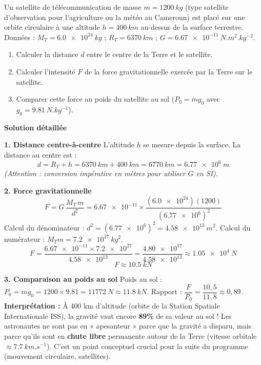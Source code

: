 \documentclass[11pt]{article}
\begin{document}
\begin{exoresolu}
Un satellite de télécommunication de masse $m = \SI{1200}{kg}$ (type satellite d'observation pour l'agriculture ou la météo au Cameroun) est placé sur une orbite circulaire à une altitude $h = \SI{400}{km}$ au-dessus de la surface terrestre.
Données : $M_T = \SI{6,0e24}{kg}$ ; $R_T = \SI{6370}{km}$ ; $G = \SI{6,67e-11}{N.m^2.kg^{-2}}$.
\begin{enumerate}
    \item Calculer la distance $d$ entre le centre de la Terre et le satellite.
    \item Calculer l'intensité $F$ de la force gravitationnelle exercée par la Terre sur le satellite.
    \item Comparer cette force au poids du satellite au sol ($P_0 = m g_0$ avec $g_0 = \SI{9,81}{N.kg^{-1}}$).
\end{enumerate}

\tcblower
\textbf{Solution détaillée}

\noindent \textbf{1. Distance centre-à-centre}
L'altitude $h$ se mesure depuis la surface. La distance au centre est :
\[
d = R_T + h = \SI{6370}{km} + \SI{400}{km} = \SI{6770}{km} = \SI{6,77e6}{m}
\]
\emph{(Attention : conversion impérative en mètres pour utiliser $G$ en SI).}

\noindent \textbf{2. Force gravitationnelle}
\[
F = G\,\frac{M_T\,m}{d^2}
= \num{6,67e-11} \times \frac{(\num{6,0e24})(\num{1200})}{(\num{6,77e6})^2}
\]
Calcul du dénominateur : $d^2 = (\num{6,77e6})^2 = \SI{4,58e13}{m^2}$.
Calcul du numérateur : $M_T m = \SI{7,2e27}{kg^2}$.
\[
F = \frac{\num{6,67e-11} \times \num{7,2e27}}{\num{4,58e13}}
= \frac{\num{4,80e17}}{\num{4,58e13}}
\approx \SI{1,05e4}{N}
\]
\[
\boxed{F \approx \SI{10,5}{kN}}
\]

\noindent \textbf{3. Comparaison au poids au sol}
Poids au sol : $P_0 = m g_0 = \num{1200} \times \num{9,81} = \SI{11772}{N} \approx \SI{11,8}{kN}$.
Rapport : $\dfrac{F}{P_0} = \dfrac{10,5}{11,8} \approx 0,89$.
\textbf{Interprétation :} À 400 km d'altitude (orbite de la Station Spatiale Internationale ISS), la gravité vaut encore \textbf{89\%} de sa valeur au sol ! Les astronautes ne sont pas en « apesanteur » parce que la gravité a disparu, mais parce qu'ils sont en \textbf{chute libre} permanente autour de la Terre (vitesse orbitale $\approx \SI{7,7}{km.s^{-1}}$). C'est un point conceptuel crucial pour la suite du programme (mouvement circulaire, satellites).
\end{exoresolu}
\end{document}
